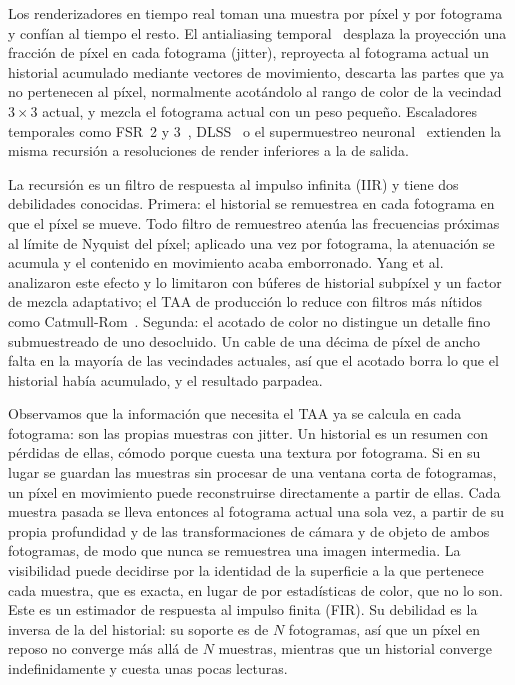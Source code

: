 \documentclass[11pt,a4paper]{article}
\begin{document}
Los renderizadores en tiempo real toman una muestra por píxel y por fotograma y confían al tiempo el resto. El antialiasing temporal~\cite{karis2014taa,salvi2016taa,yang2020survey} desplaza la proyección una fracción de píxel en cada fotograma (jitter), reproyecta al fotograma actual un historial acumulado mediante vectores de movimiento, descarta las partes que ya no pertenecen al píxel, normalmente acotándolo al rango de color de la vecindad $3\times3$ actual, y mezcla el fotograma actual con un peso pequeño. Escaladores temporales como FSR~2 y 3~\cite{amd2023fsr2,amd2024fsr3}, DLSS~\cite{liu2020dlss} o el supermuestreo neuronal~\cite{xiao2020neural} extienden la misma recursión a resoluciones de render inferiores a la de salida.

La recursión es un filtro de respuesta al impulso infinita (IIR) y tiene dos debilidades conocidas. Primera: el historial se remuestrea en cada fotograma en que el píxel se mueve. Todo filtro de remuestreo atenúa las frecuencias próximas al límite de Nyquist del píxel; aplicado una vez por fotograma, la atenuación se acumula y el contenido en movimiento acaba emborronado. Yang et al.~\cite{yang2009amortized} analizaron este efecto y lo limitaron con búferes de historial subpíxel y un factor de mezcla adaptativo; el TAA de producción lo reduce con filtros más nítidos como Catmull-Rom~\cite{catmull1974splines,jimenez2016filmic}. Segunda: el acotado de color no distingue un detalle fino submuestreado de uno desocluido. Un cable de una décima de píxel de ancho falta en la mayoría de las vecindades actuales, así que el acotado borra lo que el historial había acumulado, y el resultado parpadea.

Observamos que la información que necesita el TAA ya se calcula en cada fotograma: son las propias muestras con jitter. Un historial es un resumen con pérdidas de ellas, cómodo porque cuesta una textura por fotograma. Si en su lugar se guardan las muestras sin procesar de una ventana corta de fotogramas, un píxel en movimiento puede reconstruirse directamente a partir de ellas. Cada muestra pasada se lleva entonces al fotograma actual una sola vez, a partir de su propia profundidad y de las transformaciones de cámara y de objeto de ambos fotogramas, de modo que nunca se remuestrea una imagen intermedia. La visibilidad puede decidirse por la identidad de la superficie a la que pertenece cada muestra, que es exacta, en lugar de por estadísticas de color, que no lo son. Este es un estimador de respuesta al impulso finita (FIR). Su debilidad es la inversa de la del historial: su soporte es de $N$ fotogramas, así que un píxel en reposo no converge más allá de $N$ muestras, mientras que un historial converge indefinidamente y cuesta unas pocas lecturas.
\end{document}
